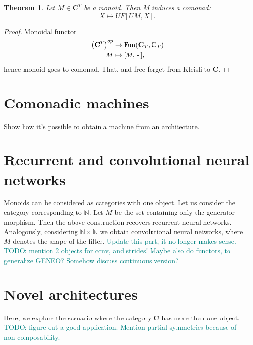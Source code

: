 \documentclass[12pt]{article}
\newtheorem{theorem}{Theorem}
\newcommand{\pietro}[1]{\textcolor{teal}{#1}}
\newcommand{\N}{{\mathbb{N}}}
\newcommand{\Fun}{{\textnormal{Fun}}}
\newcommand{\Cat}{{\mathbf{C}}}
\newcommand{\anon}{{\,\mbox{-}\,}}
\begin{document}
\begin{theorem}\label{thm:weight_sharing}
    Let $M \in \Cat^T$ be a monoid. Then $M$ induces a comonad:
    \begin{equation*}
        X \mapsto UF[UM, X].
    \end{equation*}
\end{theorem}

\begin{proof}
    Monoidal functor
    \begin{align*}
        \left(\Cat^T\right)^{op} & \rightarrow \Fun(\Cat_T, \Cat_T) \\
        M                        & \mapsto [M, \anon],
    \end{align*}
    hence monoid goes to comonad. That, and free forget from Kleisli to $\Cat$.
\end{proof}

\section{Comonadic machines}

Show how it's possible to obtain a machine from an architecture.

\section{Recurrent and convolutional neural networks}

Monoids can be considered as categories with one object. Let us consider the category corresponding to $\N$. Let $M$ be the set containing only the generator morphism. Then the above construction recovers recurrent neural networks. Analogously, considering $\N \times \N$ we obtain convolutional neural networks, where $M$ denotes the shape of the filter. \pietro{Update this part, it no longer makes sense.}
\pietro{TODO: mention 2 objects for conv, and strides!}
\pietro{Maybe also do functors, to generalize GENEO? Somehow discuss continuous version?}

\section{Novel architectures}

Here, we explore the scenario where the category $\Cat$ has more than one object.
\pietro{TODO: figure out a good application.}
\pietro{Mention partial symmetries because of non-composability.}



\end{document}
